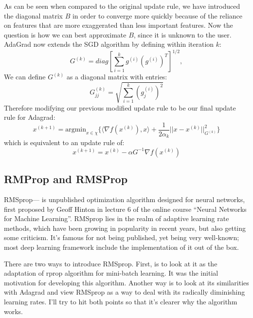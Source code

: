 As can be seen when compared to the original update rule, we have introduced the diagonal matrix
$B$ in order to converge more quickly because of the reliance on features that are
more exaggerated than less important features.
Now the question is how we can best approximate $B$, since it is unknown to the user.
AdaGrad now extends the SGD algorithm by defining within iteration $k$:
\begin{equation}
	\label{equ:adagrad_extension}
	G^{(k)} = diag[\sum_{i=1}^{k}g^{(i)}(g^{(i)})^{T}]^{1/2},
\end{equation}
We can define $G^{(k)}$ as a diagonal matrix with entries:
\begin{equation}
	\label{equ:adagrad_matrix}
	G^{(k)}_{jj} = \sqrt{\sum_{i=1}^{k} (g_j^{(i)})^2}
\end{equation}
Therefore modifying our previous modified update rule to be our final update rule for Adagrad:
\begin{equation}
	\label{equ:adagrad_opt}
	x^{(k+1)} = \text{argmin}_{x \in \chi} \{ \langle \nabla f(x^{(k)}), x \rangle + 
	\frac{1}{2 \alpha_k} \lvert \lvert x - x^{(k)} \rvert \rvert_{G^{(k)}}^2 \}
\end{equation}
which is equivalent to an update rule of:
\begin{equation}
	\label{equ:adagrad_opt_equiv}
	x^{(k+1)} = x^{(k)} - \alpha G^{-1} \nabla f(x^{(k)})
\end{equation}

\subsection{RMProp and RMSProp}
RMSprop— is unpublished optimization algorithm designed for neural networks, first proposed by
Geoff Hinton in lecture 6 of the online course “Neural Networks for Machine Learning”.
RMSprop lies in the realm of adaptive learning rate methods, which have been growing in
popularity in recent years, but also getting some criticism. 
It’s famous for not being published, yet being very well-known; most deep learning framework 
include the implementation of it out of the box.

There are two ways to introduce RMSprop. First, is to look at it as the adaptation of rprop
algorithm for mini-batch learning. 
It was the initial motivation for developing this algorithm. Another way is to look at its 
similarities with Adagrad and view RMSprop as a way to deal with its radically diminishing
learning rates.
I’ll try to hit both points so that it’s clearer why the algorithm works.

